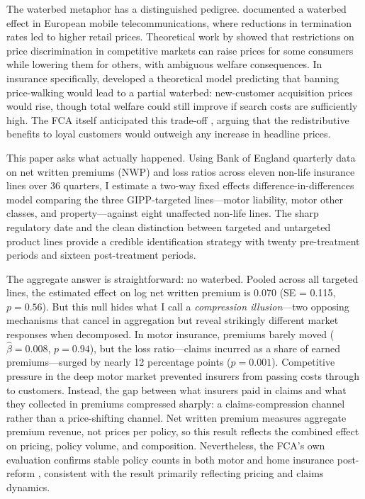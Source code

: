 \documentclass[12pt]{article}
\begin{document}
The waterbed metaphor has a distinguished pedigree. \citet{GenakosValletti2011} documented a waterbed effect in European mobile telecommunications, where reductions in termination rates led to higher retail prices. Theoretical work by \citet{ArmstrongVickers2001} showed that restrictions on price discrimination in competitive markets can raise prices for some consumers while lowering them for others, with ambiguous welfare consequences. In insurance specifically, \citet{FuYangGaoChen2024} developed a theoretical model predicting that banning price-walking would lead to a partial waterbed: new-customer acquisition prices would rise, though total welfare could still improve if search costs are sufficiently high. The FCA itself anticipated this trade-off \citep{FCA_PS21_5, FCA_PS21_11}, arguing that the redistributive benefits to loyal customers would outweigh any increase in headline prices.

This paper asks what actually happened. Using Bank of England quarterly data on net written premiums (NWP) and loss ratios across eleven non-life insurance lines over 36 quarters, I estimate a two-way fixed effects difference-in-differences model comparing the three GIPP-targeted lines---motor liability, motor other classes, and property---against eight unaffected non-life lines. The sharp regulatory date and the clean distinction between targeted and untargeted product lines provide a credible identification strategy with twenty pre-treatment periods and sixteen post-treatment periods.

The aggregate answer is straightforward: no waterbed. Pooled across all targeted lines, the estimated effect on log net written premium is 0.070 (SE = 0.115, $p = 0.56$). But this null hides what I call a \textit{compression illusion}---two opposing mechanisms that cancel in aggregation but reveal strikingly different market responses when decomposed. In motor insurance, premiums barely moved ($\hat{\beta} = 0.008$, $p = 0.94$), but the loss ratio---claims incurred as a share of earned premiums---surged by nearly 12 percentage points ($p = 0.001$). Competitive pressure in the deep motor market prevented insurers from passing costs through to customers. Instead, the gap between what insurers paid in claims and what they collected in premiums compressed sharply: a claims-compression channel rather than a price-shifting channel. Net written premium measures aggregate premium revenue, not prices per policy, so this result reflects the combined effect on pricing, policy volume, and composition. Nevertheless, the FCA's own evaluation confirms stable policy counts in both motor and home insurance post-reform \citep{FCA_EP25_2}, consistent with the result primarily reflecting pricing and claims dynamics.
\end{document}

